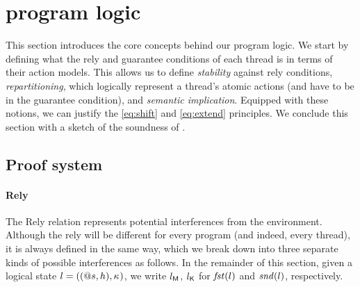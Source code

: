 \section{\colosl program logic}

This section introduces the core concepts behind our program logic. We
start by defining what the rely and guarantee conditions of each
thread is in terms of their action models. This allows us to define
\emph{stability} against rely conditions, \emph{repartitioning},
which logically represent a thread's atomic actions (and have to be in
the guarantee condition), and \emph{semantic implication}. Equipped
with these notions, we can justify the \eqref{eq:shift} and
\eqref{eq:extend} principles. We conclude this section with a sketch
of the soundness of \colosl.

\subsection{Proof system}

\paragraph{Rely}
The Rely relation represents potential interferences from the
environment. Although the rely will be different for every program
(and indeed, every thread), it is always defined in the same way,
which we break down into three separate kinds of possible
interferences as follows. In the remainder of this section, given a
logical state $l = ((@s,h),\kappa_{})$, we write $l_{\textsf{M}}$, $l_{\textsf{K}}$ for
$\mathit{fst}(l)$ and $\mathit{snd}(l)$, respectively.

